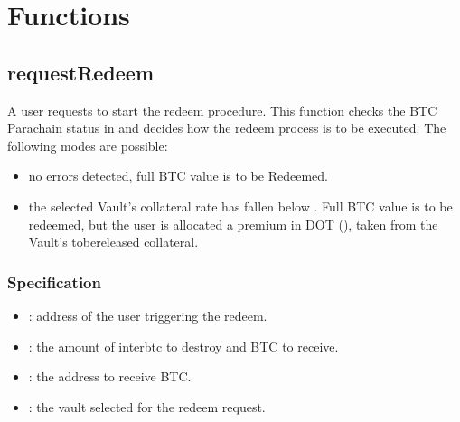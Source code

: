 \documentclass[a4paper,10pt,english]{sphinxmanual}
\begin{document}
\section{Functions}
\label{\detokenize{spec/redeem:functions}}

\subsection{requestRedeem}
\label{\detokenize{spec/redeem:requestredeem}}\label{\detokenize{spec/redeem:id5}}
A user requests to start the redeem procedure.
This function checks the BTC Parachain status in {\hyperref[\detokenize{spec/security:security}]{}} and decides how the redeem process is to be executed.
The following modes are possible:
\begin{itemize}
\item {} 
 \sphinxhyphen{} no errors detected, full BTC value is to be Redeemed.

\item {} 
 \sphinxhyphen{} the selected Vault’s collateral rate has fallen below . Full BTC value is to be redeemed, but the user is allocated a premium in DOT (), taken from the Vault’s to\sphinxhyphen{}be\sphinxhyphen{}released collateral.

\end{itemize}


\subsubsection{Specification}
\label{\detokenize{spec/redeem:specification}}


\begin{itemize}
\item {} 
: address of the user triggering the redeem.

\item {} 
: the amount of interbtc to destroy and BTC to receive.

\item {} 
: the address to receive BTC.

\item {} 
: the vault selected for the redeem request.

\end{itemize}
\end{document}
